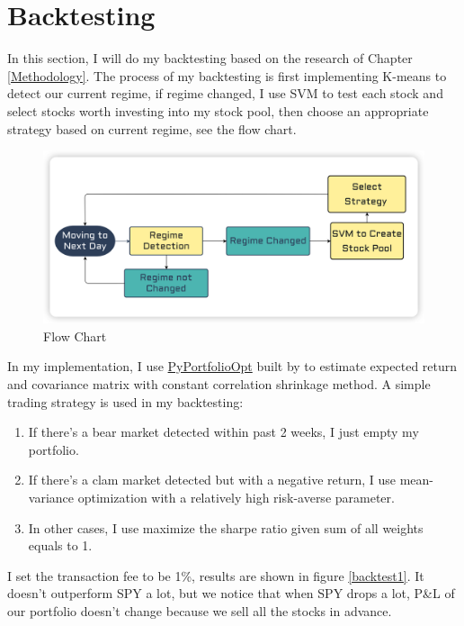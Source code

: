 \documentclass[a4paper,12pt]{article}
\begin{document}
\section{Backtesting}

In this section, I will do my backtesting based on the research of Chapter \ref{Methodology}. The process of my backtesting is first implementing K-means to detect our current regime, if regime changed, I use SVM to test each stock and select stocks worth investing into my stock pool, then choose an appropriate strategy based on current regime, see the flow chart.

\begin{figure}[H]
    \centering
    \includegraphics[scale=0.4]{invest.png}
    \caption{Flow Chart}\label{flow_chart}
\end{figure}

In my implementation, I use \href{https://pyportfolioopt.readthedocs.io/en/latest/}{PyPortfolioOpt} built by  \cite{Martin2021} to estimate expected return and covariance matrix with constant correlation shrinkage method. A simple trading strategy is used in my backtesting: 

\begin{enumerate}
    \item If there's a bear market detected within past 2 weeks, I just empty my portfolio.
    \item If there's a clam market detected but with a negative return, I use mean-variance optimization with a relatively high risk-averse parameter.
    \item In other cases, I use maximize the sharpe ratio given sum of all weights equals to 1.
  \end{enumerate}

I set the transaction fee to be 1\%, results are shown in figure \ref{backtest1}. It doesn't outperform SPY a lot, but we notice that when SPY drops a lot, P\&L of our portfolio doesn't change because we sell all the stocks in advance.
\end{document}
